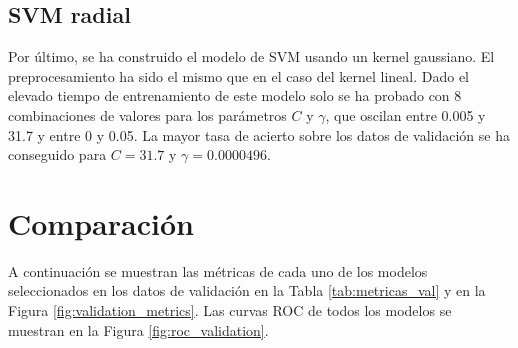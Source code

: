 \documentclass[12pt,a4paper,]{book}
\numberwithin{dummy}{section}
\theoremstyle{ocrenumbox}
\theoremstyle{blacknumex}
\theoremstyle{blacknumbox}
\theoremstyle{ocrenum}
\theoremstyle{ocrenum}
\begin{document}
\hypertarget{svm-radial}{%
\subsection{SVM radial}\label{svm-radial}}

Por último, se ha construido el modelo de SVM usando un kernel
gaussiano. El preprocesamiento ha sido el mismo que en el caso del
kernel lineal. Dado el elevado tiempo de entrenamiento de este modelo
solo se ha probado con 8 combinaciones de valores para los parámetros
\(C\) y \(\gamma\), que oscilan entre 0.005 y 31.7 y entre 0 y 0.05. La
mayor tasa de acierto sobre los datos de validación se ha conseguido
para \(C = 31.7\) y \(\gamma = 0.0000496\).

\hypertarget{comparaciuxf3n}{%
\section{Comparación}\label{comparaciuxf3n}}

A continuación se muestran las métricas de cada uno de los modelos
seleccionados en los datos de validación en la Tabla
\ref{tab:metricas_val} y en la Figura \ref{fig:validation_metrics}. Las
curvas ROC de todos los modelos se muestran en la Figura
\ref{fig:roc_validation}.

\begin{table}[]
\centering
{}
\caption{Métricas de los modelos seleccionados sobre el conjunto de validación.}
\label{tab:metricas_val}
\end{table}
\end{document}
